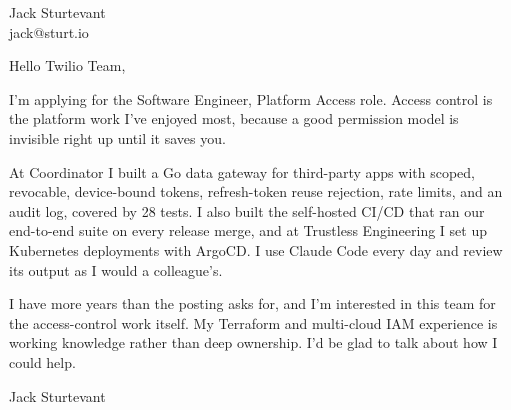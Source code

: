 \documentclass[11pt]{article}
\begin{document}
\raggedright

{\namefont\fontsize{20pt}{24pt}\selectfont Jack Sturtevant}\\[-0.3em]
jack@sturt.io

\vspace{1.2em}

Hello Twilio Team,

I'm applying for the Software Engineer, Platform Access role. Access control is the platform work I've enjoyed most, because a good permission model is invisible right up until it saves you.

At Coordinator I built a Go data gateway for third-party apps with scoped, revocable, device-bound tokens, refresh-token reuse rejection, rate limits, and an audit log, covered by 28 tests. I also built the self-hosted CI/CD that ran our end-to-end suite on every release merge, and at Trustless Engineering I set up Kubernetes deployments with ArgoCD. I use Claude Code every day and review its output as I would a colleague's.

I have more years than the posting asks for, and I'm interested in this team for the access-control work itself. My Terraform and multi-cloud IAM experience is working knowledge rather than deep ownership. I'd be glad to talk about how I could help.

\vspace{0.6em}
Jack Sturtevant
\end{document}
